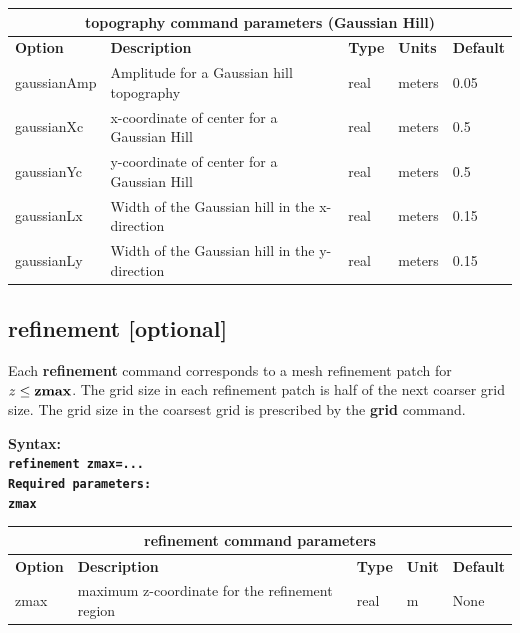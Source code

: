 \documentclass[11pt]{report}
\begin{document}
\begin{center}
\begin{tabular}{|l|p{8cm}|l|l|l|} \hline
\multicolumn{5}{|c|}{\bf topography command parameters (Gaussian Hill)}\\ \hline
\bf{Option} & \bf{Description} & \bf{Type} & \bf{Units} & \bf{Default}\\ \hline \hline
%
gaussianAmp & Amplitude for a Gaussian hill topography & real & meters & 0.05\\ \hline	
gaussianXc & x-coordinate of center for a Gaussian Hill & real & meters & 0.5\\ \hline	
gaussianYc & y-coordinate of center for a Gaussian Hill & real & meters & 0.5 \\ \hline
gaussianLx & Width of the Gaussian hill in the x-direction & real & meters & 0.15 \\ \hline
gaussianLy & Width of the Gaussian hill in the y-direction & real & meters & 0.15 \\ \hline
\end{tabular}
\end{center}

\subsection{refinement [optional]}
\label{keyword:refinement}
 Each {\bf refinement} command corresponds to a mesh refinement patch for $z\leq{\bf zmax}$. The grid
 size in each refinement patch is half of the next coarser grid size. The grid size in the coarsest
 grid is prescribed by the {\bf grid} command.
 \begin{flushleft}\bf
 Syntax:\\
 \tt refinement zmax=...
 \\
 \bf Required parameters:\\
 \tt zmax
 \end{flushleft}
 \begin{center}
 \begin{tabular}{|l|p{8cm}|l|l|l|} \hline
 \multicolumn{5}{|c|}{\bf refinement command parameters}\\ \hline
 \bf{Option} & \bf{Description} & \bf{Type} & \bf{Unit} & \bf{Default} \\ \hline \hline
 zmax & maximum z-coordinate for the refinement region & real & m & None\\ \hline
 \end{tabular}
 \end{center}
\end{document}
